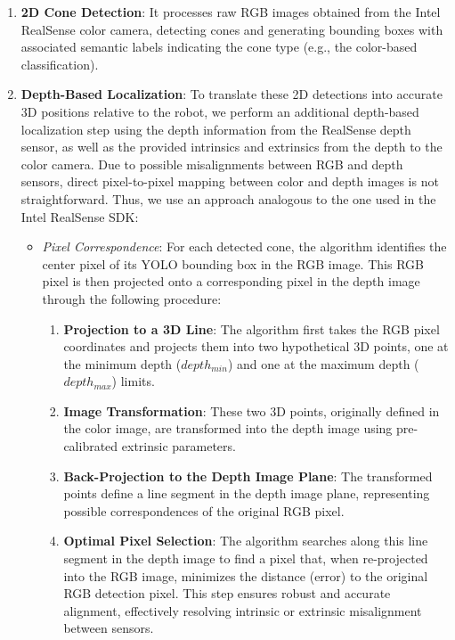 \begin{enumerate}
    \item \textbf{2D Cone Detection}: It processes raw RGB images obtained from the Intel RealSense color camera, detecting cones and generating bounding boxes with associated semantic labels indicating the cone type (e.g., the color-based classification).

    \item \textbf{Depth-Based Localization}: To translate these 2D detections into accurate 3D positions relative to the robot, we perform an additional depth-based localization step using the depth information from the RealSense depth sensor, as well as the provided intrinsics and extrinsics from the depth to the color camera. Due to possible misalignments between RGB and depth sensors, direct pixel-to-pixel mapping between color and depth images is not straightforward. Thus, we use an approach analogous to the one used in the Intel RealSense SDK:
    
    \begin{itemize}
        \item \textit{Pixel Correspondence}: For each detected cone, the algorithm identifies the center pixel of its YOLO bounding box in the RGB image. This RGB pixel is then projected onto a corresponding pixel in the depth image through the following procedure:
        
        \begin{enumerate}[label=(\alph*)]
            \item \textbf{Projection to a 3D Line}: The algorithm first takes the RGB pixel coordinates and projects them into two hypothetical 3D points, one at the minimum depth ($depth_{min}$) and one at the maximum depth ($depth_{max}$) limits.
            
            \item \textbf{Image Transformation}: These two 3D points, originally defined in the color image, are transformed into the depth image using pre-calibrated extrinsic parameters.
            
            \item \textbf{Back-Projection to the Depth Image Plane}: The transformed points define a line segment in the depth image plane, representing possible correspondences of the original RGB pixel.
            
            \item \textbf{Optimal Pixel Selection}: The algorithm searches along this line segment in the depth image to find a pixel that, when re-projected into the RGB image, minimizes the distance (error) to the original RGB detection pixel. This step ensures robust and accurate alignment, effectively resolving intrinsic or extrinsic misalignment between sensors.
        \end{enumerate}
        

\end{itemize}
\end{enumerate}
